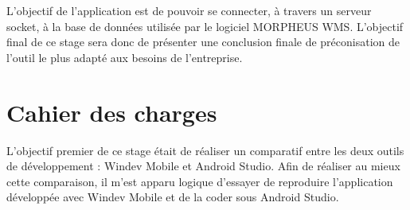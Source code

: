 \documentclass[a4paper, 12pt, french]{article}
\begin{document}
		\vspace{\baselineskip}
		\par L'objectif de l'application est de pouvoir se connecter, à travers un serveur socket, à la base de données utilisée par le logiciel MORPHEUS WMS.
		L'objectif final de ce stage sera donc de présenter une conclusion finale de préconisation de l'outil le plus adapté aux besoins de l'entreprise.
	
	\newpage

	\section{Cahier des charges}
		L'objectif premier de ce stage était de réaliser un comparatif entre les deux outils de développement : Windev Mobile et Android Studio. Afin de réaliser au mieux cette comparaison, il m'est apparu logique d'essayer de reproduire l'application développée avec Windev Mobile et de la coder sous Android Studio.\\
\end{document}
